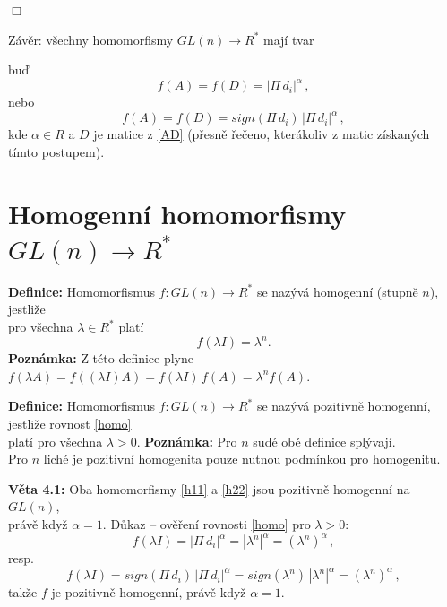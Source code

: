 \documentclass[12pt]{article}
\begin{document}
$\Box$
\vspace{3mm}

Závěr: všechny homomorfismy $GL(n) \rightarrow R^*$ mají tvar 

\vspace{1mm}
buď 
\begin{equation}
\label{h11}
f(A) = f(D) = |\Pi\,  d_i|^\alpha \, ,
\end{equation}
nebo 
\begin{equation}
\label{h22}
f(A) = f(D) = sign(\Pi\,  d_i)\,|\Pi\,  d_i|^\alpha \, ,
\end{equation}
kde $\alpha \in R$ a $D$ je matice z \ref{AD} (přesně řečeno, kterákoliv z matic získaných tímto postupem). 
\vspace{2mm}



{\section{Homogenní homomorfismy $GL(n) \rightarrow R^*$ }} 

\textbf{Definice:} 
\vspace{1mm}
Homomorfismus $f: GL(n) \rightarrow R^*$ se nazývá homogenní (stupně $n$), jestliže\\
pro všechna $\lambda \in R^*$ platí 
\begin{equation}
\label{homo}
f(\lambda I) = \lambda^n .
\end{equation}
\textbf{Poznámka:} 
\vspace{1mm}
Z této definice plyne $f(\lambda A) = f((\lambda I) A) =f(\lambda I) \,f(A) = \lambda^n f(A)$.
\vspace{3mm}

\textbf{Definice:} 
\vspace{1mm}
Homomorfismus $f: GL(n) \rightarrow R^*$ se nazývá pozitivně homogenní, jestliže rovnost \ref{homo} \\
platí pro všechna $\lambda > 0$.
\vspace{1mm}
\textbf{Poznámka:} 
\vspace{1mm}
Pro $n$ sudé obě definice splývají.\\
Pro $n$ liché je pozitivní homogenita pouze nutnou podmínkou pro homogenitu.
\vspace{2mm}


\vspace{3mm}
\textbf{Věta 4.1:} Oba homomorfismy \ref{h11} a \ref{h22} jsou pozitivně homogenní na $GL(n)$,\\
 právě když $\alpha = 1$. 
\vspace{2mm}
Důkaz -- ověření rovnosti \ref{homo} pro $\lambda > 0$:
\begin{equation}
\label{hi1}
f(\lambda I) = |\Pi\, d_i|^\alpha = |\lambda^n|^\alpha  = (\lambda^n)^\alpha\, ,
\end{equation}
resp.
\begin{equation}
\label{hi2}
f(\lambda I) = sign(\Pi\, d_i)\,|\Pi\, d_i|^\alpha 
= sign(\lambda^n)\,|\lambda^n|^\alpha = (\lambda^n)^\alpha  \, ,
\end{equation}
takže $f$ je pozitivně homogenní, právě když $\alpha = 1$.  
\end{document}
